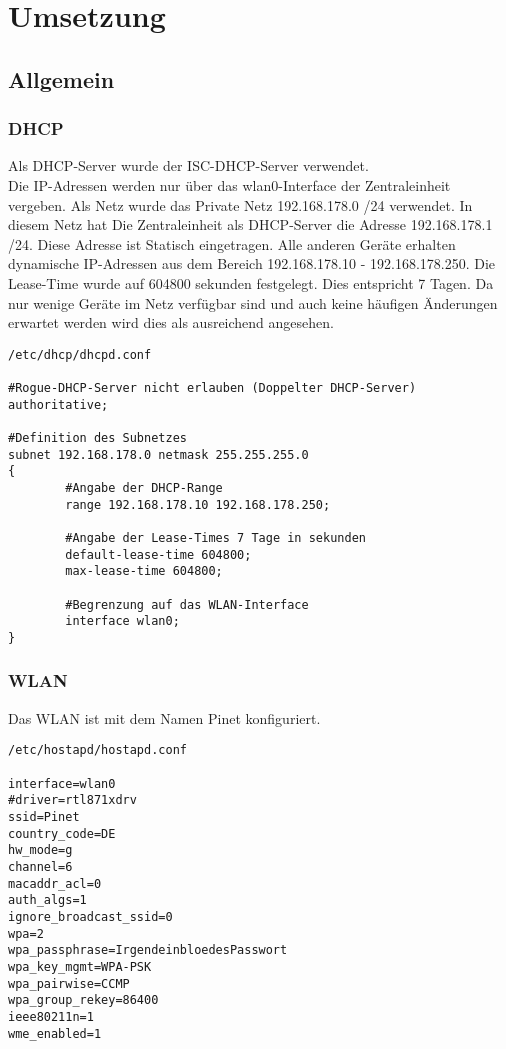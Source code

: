 \chapter{Umsetzung}

\section{Allgemein}

\subsection{DHCP}

Als DHCP-Server wurde der ISC-DHCP-Server verwendet.\\
Die IP-Adressen werden nur über das wlan0-Interface der Zentraleinheit vergeben.
Als Netz wurde das Private Netz 192.168.178.0 /24 verwendet. In diesem Netz hat
Die Zentraleinheit als DHCP-Server die Adresse 192.168.178.1 /24. Diese Adresse
ist Statisch eingetragen. Alle anderen Geräte erhalten dynamische IP-Adressen
aus dem Bereich 192.168.178.10 - 192.168.178.250. Die Lease-Time wurde auf
604800 sekunden festgelegt. Dies entspricht 7 Tagen. Da nur wenige Geräte im
Netz verfügbar sind und auch keine häufigen Änderungen erwartet werden wird dies
als ausreichend angesehen.

\begin{verbatim}
/etc/dhcp/dhcpd.conf

#Rogue-DHCP-Server nicht erlauben (Doppelter DHCP-Server)
authoritative;

#Definition des Subnetzes
subnet 192.168.178.0 netmask 255.255.255.0
{
        #Angabe der DHCP-Range
        range 192.168.178.10 192.168.178.250;

        #Angabe der Lease-Times 7 Tage in sekunden
        default-lease-time 604800;
        max-lease-time 604800;

        #Begrenzung auf das WLAN-Interface
        interface wlan0;
}

\end{verbatim}

\subsection{WLAN}

Das WLAN ist mit dem Namen Pinet konfiguriert.


\begin{verbatim}
/etc/hostapd/hostapd.conf

interface=wlan0
#driver=rtl871xdrv
ssid=Pinet
country_code=DE
hw_mode=g
channel=6
macaddr_acl=0
auth_algs=1
ignore_broadcast_ssid=0
wpa=2
wpa_passphrase=IrgendeinbloedesPasswort
wpa_key_mgmt=WPA-PSK
wpa_pairwise=CCMP
wpa_group_rekey=86400
ieee80211n=1
wme_enabled=1

\end{verbatim}

